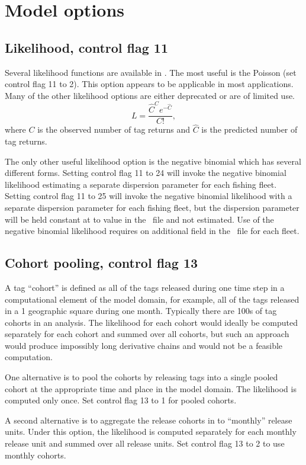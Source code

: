 \section*{Model options}
\subsection*{Likelihood, control flag 11}
Several likelihood functions are available in \TE. The most useful
is the Poisson (set control flag 11 to 2). This option appears to be
applicable in most applications.  Many of the other
likelihood options are either deprecated or are of limited use. 
\begin{equation}
L = \frac{\widehat{C}^C e^{-\widehat{C}}}{C!},
\label{eqn:Poiss}
\end{equation}
where $C$ is the observed number of tag returns and $\widehat{C}$ is the
predicted number of tag returns.

The only
other useful likelihood option is the negative binomial which has
several different forms. 
Setting control flag 11 to 24 will invoke the
negative binomial likelihood estimating a separate dispersion
parameter for each fishing fleet. 
Setting control flag 11 to 25 will invoke the
negative binomial likelihood with a separate dispersion
parameter for each fishing fleet, but the dispersion parameter will be
held constant at to value in the \PAR\ file and not estimated.
Use of the negative binomial likelihood requires on additional field
in the \PAR\ file for each fleet.

\subsection*{Cohort pooling, control flag 13}
A tag ``cohort'' is defined as all of the tags released during one
time step in a computational element of the model domain, for example,
all of the tags released in a 1\deg{} geographic square during one
month. Typically there are 100s of tag cohorts in an analysis.
The likelihood for each cohort would ideally be computed separately
for each cohort 
and summed over all cohorts, but such an approach
would produce impossibly long derivative chains and would not be a
feasible computation. 

One alternative is to pool the cohorts by
releasing tags into a single pooled cohort at the appropriate time and place in
the model domain. The likelihood is computed only once. 
Set control flag 13 to 1 for pooled cohorts.

A second
alternative is to aggregate the release cohorts in to ``monthly''
release units. Under this option, the likelihood is
computed separately for each monthly release unit and summed over all
release units. 
Set control flag 13 to 2 to use monthly cohorts.

